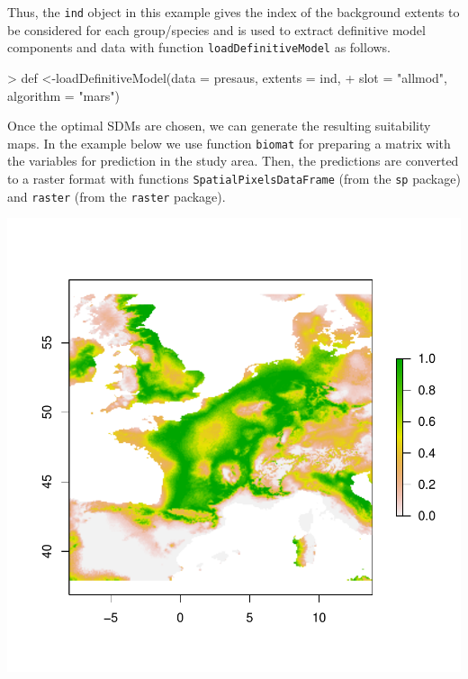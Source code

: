 \documentclass[10pt,a4paper]{article}
\begin{document}
Thus, the \texttt{ind} object in this example gives the index of the background extents to be considered for each group/species and is used to extract definitive model components and data with function \texttt{loadDefinitiveModel} as follows. 

\begin{Schunk}
\begin{Sinput}
> def <-loadDefinitiveModel(data = presaus, extents = ind, 
+                      slot = "allmod", algorithm = "mars")
\end{Sinput}
\end{Schunk}

Once the optimal SDMs are chosen, we can generate the resulting suitability maps. In the example below we use function \texttt{biomat} for preparing a matrix with the variables for prediction in the study area. Then, the predictions are converted to a raster format with functions \texttt{SpatialPixelsDataFrame} (from the \texttt{sp} package) and \texttt{raster} (from the \texttt{raster} package).

\begin{Schunk}
\end{Schunk}
\includegraphics{mopa-mopa16}





\end{document}
